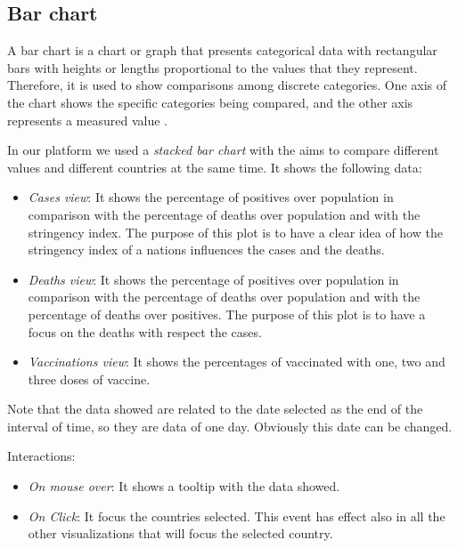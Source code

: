 \documentclass[10pt,conference]{IEEEtran}
\begin{document}
\subsection{Bar chart}
A bar chart is a chart or graph that presents categorical data with rectangular bars with heights or lengths proportional 
to the values that they represent. Therefore, it is used to show comparisons among discrete categories. One axis of the chart 
shows the specific categories being compared, and the other axis represents a measured value \cite{barchart}.

In our platform we used a {\em stacked bar chart} with the aims to compare different values and different countries at the same time. 
It shows the following data:
\begin{itemize}
	\item {\em Cases view}: It shows the percentage of positives over population in comparison with the percentage of deaths over population and with the stringency index. The purpose of this plot is to have a clear idea of how the stringency index of a nations influences the cases and the deaths.
	\item {\em Deaths view}: It shows the percentage of positives over population in comparison with the percentage of deaths over population and with the percentage of deaths over positives. The purpose of this plot is to have a focus on the deaths with respect the cases.
	\item {\em Vaccinations view}: It shows the percentages of vaccinated with one, two and three doses of vaccine.
\end{itemize}

Note that the data showed are related to the date selected as the end of the interval of time, so they are data of one day. Obviously this date can be changed.

Interactions:
\begin{itemize}
	\item {\em On mouse over}: It shows a tooltip with the data showed.
	\item {\em On Click}: It focus the countries selected. This event has effect also in all the other visualizations that will focus the selected country.
\end{itemize}

\begin{figure}
\end{figure}
\end{document}
